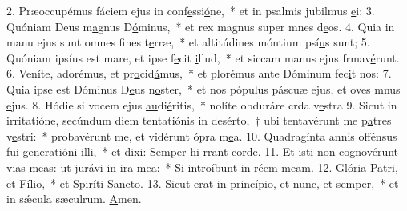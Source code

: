 2. Præoccupémus fáciem ejus in conf\uline{e}ssi\uline{ó}ne,~* et in psalmis jubilmus \uline{e}i:
3. Quóniam Deus m\uline{a}gnus D\uline{ó}minus,~* et rex magnus super mnes d\uline{e}os.
4. Quia in manu ejus sunt omnes f\uline{i}nes t\uline{e}rræ,~* et altitúdines móntium psí\uline{u}s sunt;
5. Quóniam ipsíus est mare, et ipse f\uline{e}cit \uline{i}llud,~* et siccam manus ejus frmav\uline{é}runt.
6. Veníte, adorémus, et pr\uline{o}cid\uline{á}mus,~* et plorémus ante Dóminum  fec\uline{i}t nos:
7. Quia ipse est Dóminus D\uline{e}us n\uline{o}ster,~* et nos pópulus páscuæ ejus, et oves mnus \uline{e}jus.
8. Hódie si vocem ejus \uline{au}di\uline{é}ritis,~* nolíte obduráre crda v\uline{e}stra
9. Sicut in irritatióne, secúndum diem tentatiónis in desérto,~† ubi tentavérunt me p\uline{a}tres v\uline{e}stri:~* probavérunt me, et vidérunt ópra m\uline{e}a.
10. Quadragínta annis offénsus fui generati\uline{ó}ni \uline{i}lli,~* et dixi: Semper hi rrant c\uline{o}rde.
11. Et isti non cognovérunt vias meas: ut jurávi in \uline{i}ra m\uline{e}a:~* Si introíbunt in réem m\uline{e}am.
12. Glória P\uline{a}tri, et F\uline{í}lio,~* et Spiríti S\uline{a}ncto.
13. Sicut erat in princípio, et n\uline{u}nc, et s\uline{e}mper,~* et in sǽcula sæculrum. \uline{A}men.
